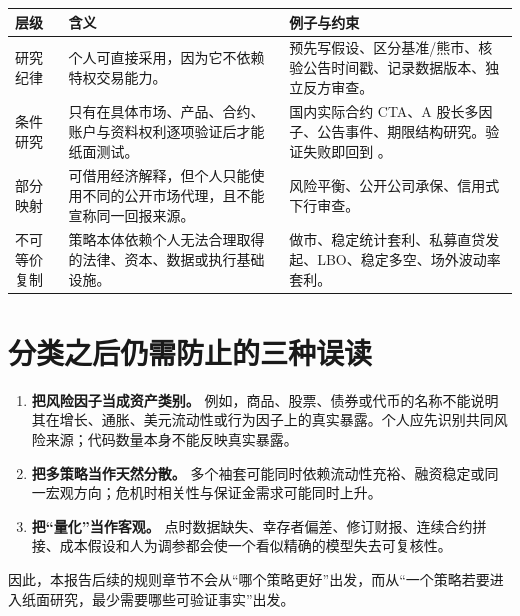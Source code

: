\begin{dashboardbox}
\begin{tabularx}{\textwidth}{L{2.5cm}X L{4.25cm}}
\toprule
\textbf{层级} & \textbf{含义} & \textbf{例子与约束} \\
\midrule
\textcolor{riskgreen}{研究纪律} & 个人可直接采用，因为它不依赖特权交易能力。 & 预先写假设、区分基准/熊市、核验公告时间戳、记录数据版本、独立反方审查。 \\
\textcolor{riskamber}{条件研究} & 只有在具体市场、产品、合约、账户与资料权利逐项验证后才能纸面测试。 & 国内实际合约 CTA、A 股长多因子、公告事件、期限结构研究。验证失败即回到 \qzero{}。 \\
\textcolor{riskamber}{部分映射} & 可借用经济解释，但个人只能使用不同的公开市场代理，且不能宣称同一回报来源。 & 风险平衡、公开公司承保、信用式下行审查。 \\
\textcolor{riskred}{不可等价复制} & 策略本体依赖个人无法合理取得的法律、资本、数据或执行基础设施。 & 做市、稳定统计套利、私募直贷发起、LBO、稳定多空、场外波动率套利。 \\
\bottomrule
\end{tabularx}
\end{dashboardbox}

\section{分类之后仍需防止的三种误读}

\begin{enumerate}
  \item \textbf{把风险因子当成资产类别。} 例如，商品、股票、债券或代币的名称不能说明其在增长、通胀、美元流动性或行为因子上的真实暴露。个人应先识别共同风险来源；代码数量本身不能反映真实暴露。
  \item \textbf{把多策略当作天然分散。} 多个袖套可能同时依赖流动性充裕、融资稳定或同一宏观方向；危机时相关性与保证金需求可能同时上升。
  \item \textbf{把“量化”当作客观。} 点时数据缺失、幸存者偏差、修订财报、连续合约拼接、成本假设和人为调参都会使一个看似精确的模型失去可复核性。
\end{enumerate}

因此，本报告后续的规则章节不会从“哪个策略更好”出发，而从“一个策略若要进入纸面研究，最少需要哪些可验证事实”出发。

